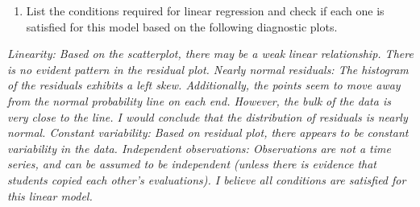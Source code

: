 \documentclass[]{article}
\providecommand{\tightlist}{%
  \setlength{\itemsep}{0pt}\setlength{\parskip}{0pt}}
\begin{document}
\begin{enumerate}
\def\labelenumi{(\alph{enumi})}
\setcounter{enumi}{2}
\tightlist
\item
  List the conditions required for linear regression and check if each
  one is satisfied for this model based on the following diagnostic
  plots.
\end{enumerate}

\emph{Linearity: Based on the scatterplot, there may be a weak linear
relationship. There is no evident pattern in the residual plot. Nearly
normal residuals: The histogram of the residuals exhibits a left skew.
Additionally, the points seem to move away from the normal probability
line on each end. However, the bulk of the data is very close to the
line. I would conclude that the distribution of residuals is nearly
normal. Constant variability: Based on residual plot, there appears to
be constant variability in the data. Independent observations:
Observations are not a time series, and can be assumed to be independent
(unless there is evidence that students copied each other's
evaluations). I believe all conditions are satisfied for this linear
model.}
\end{document}
